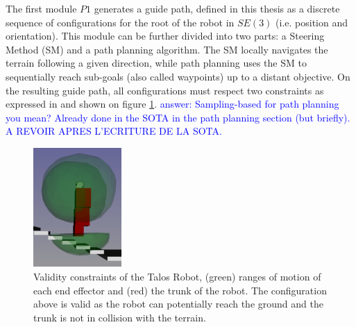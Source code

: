 The first module $P1$ generates a guide path, defined in this thesis as a discrete sequence of configurations for the root of the robot in $SE(3)$ (i.e. position and orientation).
This module can be further divided into two parts: a Steering Method (SM) and a path planning algorithm.
The SM locally navigates the terrain following a given direction, while path planning uses the SM to sequentially reach sub-goals (also called waypoints) up to a distant objective. 
On the resulting guide path, all configurations must respect two constraints as expressed in \cite{RB-PRM} and shown on figure \ref{fig:ROMs}.
\textcolor{blue}{answer: Sampling-based for path planning you mean? Already done in the SOTA in the path planning section (but briefly). A REVOIR APRES L'ECRITURE DE LA SOTA.}

\begin{figure}
    \centering
    \includegraphics[width=0.3\textwidth]{Figures/Chapter_LEAS/ROMs.png}
    \caption{Validity constraints of the Talos Robot, (green) ranges of motion of each end effector and (red) the trunk of the robot. The configuration above is valid as the robot can potentially reach the ground and the trunk is not in collision with the terrain.}
    \label{fig:ROMs}
\end{figure}

